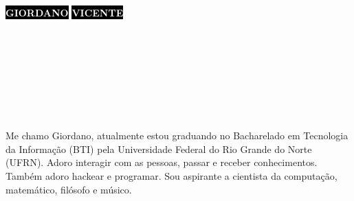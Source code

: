 \documentclass[9pt]{developercv} %
\begin{document}

\begin{minipage}[t]{0.45\textwidth}
    \vspace{-\baselineskip}
    \colorbox{black}{{\HUGE\textcolor{white}{\textbf{\MakeUppercase{Giordano}}}}}
    \hspace{30pt} \colorbox{black}{{\HUGE\textcolor{white}{\textbf{\MakeUppercase{Vicente}}}}}
    
    \vspace{6pt}
\end{minipage}
\begin{minipage}[t]{0.275\textwidth}
    \vspace{-\baselineskip}

    \\
    \\	
    \\
\end{minipage}
\begin{minipage}[t]{0.275\textwidth}
    \vspace{-\baselineskip}
    
    \\
    \\
    \\
\end{minipage}

\vspace{0.5cm}



\begin{minipage}[t]{1\textwidth}
    \vspace{0.05em}
    Me chamo Giordano, atualmente estou gradu\-ando no Bacharelado em Tecnologia da Informação (BTI) pela Universidade Federal do Rio Grande do Norte (UFRN).
    Adoro interagir com as pessoas, passar e receber conhecimentos. Também adoro hackear e programar. Sou aspirante a cientista da computação, matemático, filósofo e músico.\\
\end{minipage}
\end{document}
